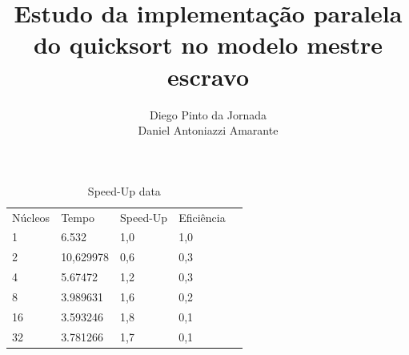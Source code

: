 \documentclass{acm_proc_article-sp}
\begin{document}
\makeatletter
\def\@copyrightspace{\relax}
\makeatother

\title{Estudo da implementação paralela do quicksort no modelo mestre escravo}

\author{
\alignauthor
Diego Pinto da Jornada\\
\alignauthor
Daniel Antoniazzi Amarante\\
}

\maketitle








\begin{table}[]
\centering
\caption{Speed-Up data}
\label{my-label}
\begin{tabular}{lllll}
Núcleos & Tempo     & Speed-Up & Eficiência \\
1       & 6.532     & 1,0      & 1,0        \\
2       & 10,629978 & 0,6      & 0,3        \\
4       & 5.67472   & 1,2      & 0,3        \\
8       & 3.989631  & 1,6      & 0,2        \\
16      & 3.593246  & 1,8      & 0,1        \\
32      & 3.781266  & 1,7      & 0,1       
\end{tabular}
\end{table}
\end{document}
